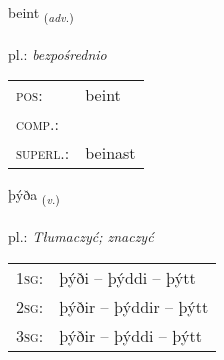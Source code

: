 \documentclass[frontgrid, backgrid]{flacards}\usepackage[]{graphicx}\usepackage[]{xcolor}
\begin{document}
\renewcommand{\blhead}{\vskip5pt {\small\bfseries\footnotesize Atviksorð | Adverb }}
\renewcommand{\bcfoot}{\vskip5pt \hspace{2pt}{\small\bfseries\footnotesize 1K}}


{beint \small{\textsubscript{(\textit{adv.})}} \\[1ex] %
\textphonetic{[pein̥t]} \\
pl.: \emph{bezpośrednio} \\  [2ex]
\renewcommand*{\arraystretch}{0.8}
\begin{tabular}{ll}
\textsc{pos}: & beint \\ 
\textsc{comp.}: &  \\ 
\textsc{superl.}: & beinast \\
\end{tabular}
}

\renewcommand{\flhead}{\vskip5pt \fboxsep=0pt {\small\bfseries\footnotesize Sagnorð | Verb}}
\renewcommand{\fcfoot}{\vskip5pt \fboxsep=0pt \hspace{2pt}{\small\bfseries\footnotesize 1K}}

\renewcommand{\blhead}{\vskip5pt {\small\bfseries\footnotesize Sagnorð | Verb }}
\renewcommand{\bcfoot}{\vskip5pt \hspace{2pt}{\small\bfseries\footnotesize 1K}}


{þýða \small{\textsubscript{(\textit{v.})}} \\[1ex] %
\textphonetic{[θiːða]} \\
pl.: \emph{Tłumaczyć; znaczyć} \\  [2ex]
\renewcommand*{\arraystretch}{0.8}
\begin{tabular}{p{1cm}l}
\textsc{1sg}: & þýði -- þýddi -- þýtt \\ 
\textsc{2sg}: & þýðir -- þýddir -- þýtt \\ 
\textsc{3sg}: & þýðir -- þýddi -- þýtt \\ 
\end{tabular}
}

\renewcommand{\flhead}{\vskip5pt \fboxsep=0pt {\small\bfseries\footnotesize Sagnorð | Verb}}
\renewcommand{\fcfoot}{\vskip5pt \fboxsep=0pt \hspace{2pt}{\small\bfseries\footnotesize 1K}}
\end{document}
